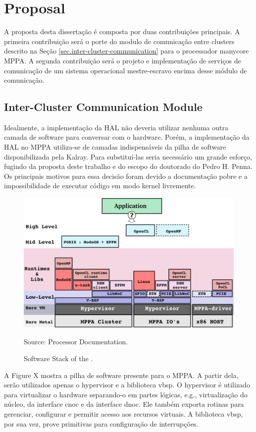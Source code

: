 \chapter{Proposal}
\label{ch.proposal}

A proposta desta dissertação é composta por duas contribuições principais.
A primeira contribuição será o porte do modulo de comunicação entre clusters
descrito na Seção \ref{sec.inter-cluster-communication} para o processador manycore MPPA.
A segunda contribuição será o projeto e implementação de serviços de comunicação de
um sistema operacional mestre-escravo encima desse módulo de comunicação.

\section{Inter-Cluster Communication Module}

	Idealmente, a implementação da HAL não deveria utilizar nenhuma outra camada
	de software para conversar com o hardware.
	Porém, a implementação da HAL no MPPA utiliza-se de camadas indispensáveis
	da pilha de software disponibilizada pela Kalray.
	Para substituí-las seria necessário um grande esforço, fugindo da proposta
	deste trabalho e do escopo do doutorado do Pedro H. Penna.
	Os principais motivos para essa decisão foram devido a documentação pobre
	e a impossibilidade de executar código em modo kernel livremente.

	\begin{figure}[t]
		\centering
		\caption{Software Stack of the \mppa.}

		\includegraphics[width=.7\textwidth]{images/software-stack.png}

		Source: \mppa Processor Documentation.

		\label{fig.conpt_sync}
	\end{figure}

	A Figure X mostra a pilha de software presente para o MPPA.
	A partir dela, serão utilizados apenas o hypervisor e a biblioteca vbsp.
	O hypervisor é utilizado para virtualizar o hardware separando-o em partes lógicas,
	e.g., virtualização do núcleo, da interface cnoc e da interface dnoc.
	Ele também exporta rotinas para gerenciar, configurar e permitir acesso aos recursos virtuais.
	A biblioteca vbsp, por sua vez, prove primitivas para configuração de interrupções.


